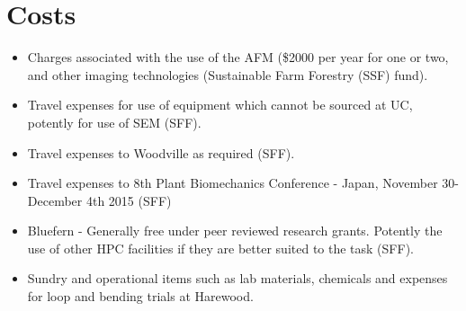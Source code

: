 \section{Costs}

\begin{itemize}
\item Charges associated with the use of the AFM (\$2000 per year for one or two, and other imaging technologies (Sustainable Farm Forestry (SSF) fund).
\end{itemize}

\begin{itemize}
\item Travel expenses for use of equipment which cannot be sourced at UC, potently for
use of SEM (SFF).
\end{itemize}

\begin{itemize}
\item Travel expenses to Woodville as required (SFF).
\end{itemize}
\begin{itemize}
\item Travel expenses to 8th Plant Biomechanics Conference - Japan, November
30-December 4th 2015 (SFF)
\end{itemize}

\begin{itemize}
\item Bluefern - Generally free under peer reviewed research grants. Potently the use
of other HPC facilities if they are better suited to the task (SFF).
\end{itemize}

\begin{itemize}
\item Sundry and operational items such as lab materials, chemicals and expenses for
loop and bending trials at Harewood.
\end{itemize}
